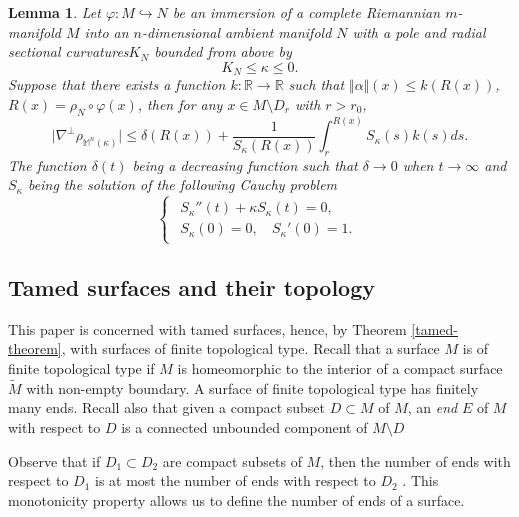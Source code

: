 \documentclass[a4paper]{amsart}
\newtheorem{lemma}[theorem]{Lemma}
\theoremstyle{definition}
\numberwithin{equation}{section}
\begin{document}
\begin{lemma}\label{kasue}{{\cite[see proof of lemma 4]{KS}}}Let $\varphi: M \hookrightarrow N$ be an immersion  of a complete Riemannian
$m$-manifold $M$ into an  $n$-dimensional ambient manifold $N$ with a pole and radial sectional curvatures$K_N$ bounded from above by
$$
K_N\leq \kappa\leq 0.
$$
Suppose that there exists a function $k:{\mathbb{R}}\to{\mathbb{R}}$ such that $\Vert \alpha \Vert (x)\leq k(R(x))$, $R(x)=\rho_{N}\circ \varphi (x)$, then for any $x\in M\setminus D_{r}$ with $r>r_0$,
\begin{equation}
 \vert \nabla^\perp \rho_{\mathbb{M}^{n}(\kappa)}\vert \leq \delta(R(x))+ \frac{1}{S_{\kappa}(R(x))}\int_{r}^{R(x)}S_{\kappa}(s)k(s)ds.
\end{equation}
The function $\delta(t)$ being a decreasing function such that $\delta\to 0$ when $t\to\infty$ and  $S_\kappa$ being the solution of the following Cauchy problem
\begin{equation}
\left\{
\begin{array}{rll}
\begin{array}{l}
   S_\kappa''(t)+\kappa S_\kappa(t)=0, \\[0.1cm]
   S_\kappa(0)=0, \,\,\,\,\; S_\kappa'(0)=1.
  \end{array}
\end{array}\right.
\end{equation}

\end{lemma}

\subsection{Tamed surfaces and their topology}

This paper is concerned with tamed surfaces, hence, by Theorem \ref{tamed-theorem},  with surfaces of finite topological type.
Recall that a surface  $M$ is of finite topological type if $M$ is homeomorphic to the interior of a compact surface $\tilde M$ with non-empty boundary. A surface of finite topological type has finitely many ends. Recall also that given a compact subset $D\subset M$ of $M$, an \emph{end} $E$ of $M$ with respect to $D$ is a connected unbounded component of $M\setminus D$

 Observe that if $D_1\subset D_2$ are compact subsets of $M$, then the number of ends with respect to $D_1$ is at most the number of ends with respect to $D_2$ . This monotonicity property allows us to define the number of ends of a surface.
\end{document}
